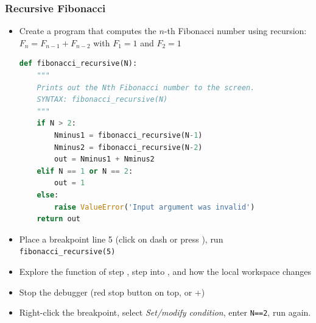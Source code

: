 {\nologo
\begin{frame}[fragile]
  \frametitle{Recursive Fibonacci}
  \begin{itemize}
    \item Create a program that computes the $n$-th Fibonacci number using recursion:\\
    $F_n = F_{n-1} + F_{n-2}$ with $F_1 = 1$ and $F_2 = 1$
    \pause
    \lstset{numbers=left}
  \begin{lstlisting}[language=Python]
def fibonacci_recursive(N):
    """
    Prints out the Nth Fibonacci number to the screen.
    SYNTAX: fibonacci_recursive(N)
    """
    if N > 2:
        Nminus1 = fibonacci_recursive(N-1)
        Nminus2 = fibonacci_recursive(N-2)
        out = Nminus1 + Nminus2
    elif N == 1 or N == 2:
        out = 1
    else:
        raise ValueError('Input argument was invalid')
    return out
  \end{lstlisting}
  \pause
    \item Place a breakpoint line 5 (click on dash or press ), run \lstinline$fibonacci_recursive(5)$
    \item Explore the function of step , step into , and how the local workspace changes
    \item Stop the debugger (red stop button on top, or +)
    \item Right-click the breakpoint, select \emph{Set/modify condition}, enter \lstinline$N==2$, run again.
  \end{itemize}
\end{frame}
}



